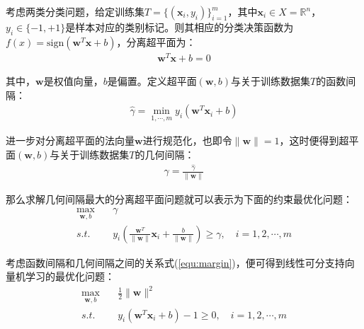 考虑两类分类问题，给定训练集$T=\{(\mathbf{x}_i,y_i)\}^m_{i=1}$，其中$\mathbf{x}_i\in X=\mathbf{\mathbb{R}}^n$，$y_i \in \{-1,+1\}$是样本对应的类别标记。则其相应的分类决策函数为$f(x)=\mathrm{sign}(\mathbf{w}^T\mathbf{x}+b)$，分离超平面为：
\begin{align} %
   \mathbf{w}^T\mathbf{x}+b=0
\end{align}

其中，$\mathbf{w}$是权值向量，$b$是偏置。定义超平面$(\mathbf{w},b)$与关于训练数据集$T$的函数间隔：
\begin{align} %
   \hat{\gamma}=\min_{1,\cdots,m}y_i(\mathbf{w}^T\mathbf{x}_i+b)
\end{align}

进一步对分离超平面的法向量$\mathbf{w}$进行规范化，也即令$\|\mathbf{w}\|=1$，这时便得到超平面$(\mathbf{w},b)$与关于训练数据集$T$的几何间隔：
\begin{align} %
   \gamma=\frac{\hat{\gamma}}{\|\mathbf{w}\|}
   \label{equ:margin} 
\end{align}

那么求解几何间隔最大的分离超平面问题就可以表示为下面的约束最优化问题：
\begin{equation}
\begin{split} %
   \max_{\mathbf{w},b} \quad & \gamma \\
   s.t. \quad & y_i \left( \frac{\mathbf{w}^T}{\|\mathbf{w}\|}\mathbf{x}_i+\frac{b}{\|\mathbf{w}\|} \right) \ge \gamma, \quad i=1,2,\cdots,m
\end{split}
\end{equation}

考虑函数间隔和几何间隔之间的关系式(\ref{equ:margin})，便可得到线性可分支持向量机学习的最优化问题：
\begin{equation}
\begin{split} %
   \max_{\mathbf{w},b} \quad & \frac{1}{2}\|\mathbf{w}\|^2 \\
   s.t. \quad & y_i(\mathbf{w}^T\mathbf{x}_i+b)-1 \ge 0, \quad i=1,2,\cdots,m
\end{split}
\end{equation}

